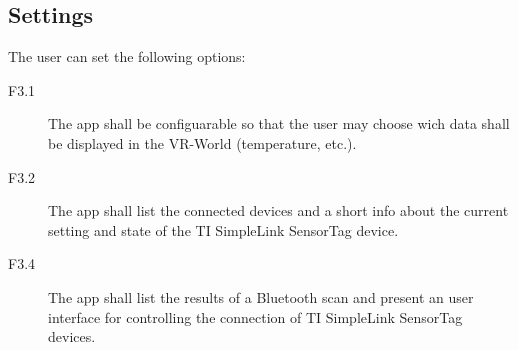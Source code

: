   \subsection{Settings}
    The user can set the following options:

    \begin{description}
      \item[F3.1] The app shall be configuarable so that the user may choose wich data shall be displayed in the VR-World (temperature, etc.).
      \item[F3.2] The app shall list the connected devices and a short info about the current setting and state of the TI SimpleLink SensorTag device.
      \item[F3.4] The app shall list the results of a Bluetooth scan and present an user interface for controlling the connection of TI SimpleLink SensorTag devices.
    \end{description}
